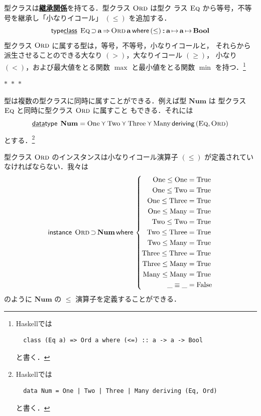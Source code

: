 \documentclass[a5paper,twoside,fleqn,draft]{jsbook}
\newcommand{\separator}{\begin{center}$*$~$*$~$*$\end{center}}
\newcommand{\programminglanguage}[1]{\textsf{#1}}
\newcommand{\haskell}{\programminglanguage{Haskell}}
\newcommand{\keyword}[1]{{\underline{\textbf{#1}}}}
\newcommand{\mKeyword}[1]{\mathsf{#1}} %
\newcommand{\mKeywordUnderline}[1]{\text{\underline{\textsf{#1}}}} %
\newcommand{\mDataTypeKeyword}{\mKeywordUnderline{data}\mKeyword{type}}
\newcommand{\mDerivingKeyword}{\mKeyword{deriving}}
\newcommand{\mInstanceKeyword}{\mKeyword{instance}}
\newcommand{\mTypeClassKeyword}{\mKeyword{type}\mKeywordUnderline{class}}
\newcommand{\mWhereKeyword}{\mKeyword{where}}
\DeclareMathOperator{\mDataType}{\mDataTypeKeyword}
\DeclareMathOperator{\mDeriving}{\mDerivingKeyword}
\DeclareMathOperator{\mInstance}{\mInstanceKeyword}
\DeclareMathOperator{\mSuperClass}{\Rightarrow}
\DeclareMathOperator{\mSuperSet}{\supset}
\DeclareMathOperator{\mTypeClass}{\mTypeClassKeyword}
\DeclareMathOperator{\mWhere}{\mWhereKeyword}
\newcommand{\mConstant}[1]{\mathrm{#1}}
\newcommand{\mSpecialConstant}[1]{\textrm{#1}} %
\newcommand{\mFalse}{\mSpecialConstant{False}}
\newcommand{\mNumOne}{\mSpecialConstant{One}}
\newcommand{\mNumTwo}{\mSpecialConstant{Two}}
\newcommand{\mNumThree}{\mSpecialConstant{Three}}
\newcommand{\mNumMany}{\mSpecialConstant{Many}}
\newcommand{\mTrue}{\mSpecialConstant{True}}
\newcommand{\mAnyParam}{\_}
\DeclareMathOperator{\mIn}{{:\!:}}
\DeclareMathOperator{\mMapsTo}{\mapsto}
\DeclareMathOperator{\mValueOr}{\curlyvee}
\newcommand{\mType}[1]{\mathbf{#1}}
\newcommand{\mBoolType}{\mType{Bool}}
\newcommand{\mGenericTypeClass}[1]{\textsc{#1}} %
\newcommand{\mEqTypeClass}{\mGenericTypeClass{Eq}}
\newcommand{\mOrdTypeClass}{\mGenericTypeClass{Ord}}
\newcommand{\mProj}[2]{#1\mMapsTo#2}
\begin{document}
型クラスは\keyword{継承関係}を持てる．型クラス $\mOrdTypeClass$ は型ク
ラス $\mEqTypeClass$ から等号，不等号を継承し「小なりイコール」
$(\le)$ を追加する．
\begin{equation}
  \mTypeClass\;\mEqTypeClass\mSuperSet\mType{a}
  \mSuperClass\mathop{\mOrdTypeClass}\mType{a}
  \mWhere{}(\le)\mIn\mProj{\mType{a}}{\mProj{\mType{a}}{\mBoolType}}
\end{equation}
型クラス $\mOrdTypeClass$ に属する型は，等号，不等号，小なりイコールと，
それらから派生させることのできる大なり $(>)$，大なりイコール $(\ge)$，
小なり $(<)$，および最大値をとる関数 $\max$ と最小値をとる関数 $\min$
を持つ．\footnote{\haskell では
\begin{verbatim}
  class (Eq a) => Ord a where (<=) :: a -> a -> Bool
\end{verbatim}
と書く．}

\separator

型は複数の型クラスに同時に属すことができる．例えば型 $\mType{Num}$ は
型クラス $\mEqTypeClass$ と同時に型クラス $\mOrdTypeClass$ に属すこと
もできる．それには
\begin{equation}
\mDataType\;\mType{Num}
=\mNumOne\mValueOr\mNumTwo\mValueOr\mNumThree\mValueOr\mNumMany
\mDeriving{}(\mEqTypeClass,\mOrdTypeClass)
\end{equation}
とする．\footnote{\haskell では
\begin{verbatim}
  data Num = One | Two | Three | Many deriving (Eq, Ord)
\end{verbatim}
と書く．}

型クラス $\mOrdTypeClass$ のインスタンスは小なりイコール演算子 $(\le)$
が定義されていなければならない．我々は
\begin{equation}
  \mInstance\;\mOrdTypeClass\mSuperSet\mType{Num}
  \mWhere{}
  \left\{
  \begin{aligned}
    \mConstant{One}\le\mConstant{One}&=\mTrue\\
    \mConstant{One}\le\mConstant{Two}&=\mTrue\\
    \mConstant{One}\le\mConstant{Three}&=\mTrue\\
    \mConstant{One}\le\mConstant{Many}&=\mTrue\\
    \mConstant{Two}\le\mConstant{Two}&=\mTrue\\
    \mConstant{Two}\le\mConstant{Three}&=\mTrue\\
    \mConstant{Two}\le\mConstant{Many}&=\mTrue\\
    \mConstant{Three}\le\mConstant{Three}&=\mTrue\\
    \mConstant{Three}\le\mConstant{Many}&=\mTrue\\
    \mConstant{Many}\le\mConstant{Many}&=\mTrue\\
    \mAnyParam\equiv\mAnyParam&=\mFalse
  \end{aligned}
  \right.
\end{equation}
のように $\mType{Num}$ の $\le$ 演算子を定義することができる．
\end{document}
